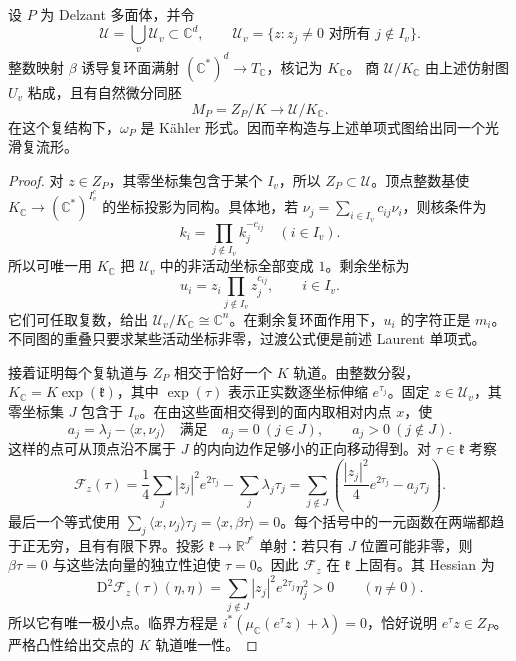 \begin{proposition}\label{g4:prop:1205:complex-quotient}
	设 \(P\) 为 Delzant 多面体，并令
	\[
		\mathcal U=\bigcup_v\mathcal U_v\subset\mathbb C^d,\qquad
		\mathcal U_v=\{z:z_j\ne0\text{ 对所有 }j\notin I_v\}.
	\]
	整数映射 \(\beta\) 诱导复环面满射
	\((\mathbb C^*)^d\to T_{\mathbb C}\)，核记为 \(K_{\mathbb C}\)。
	商 \(\mathcal U/K_{\mathbb C}\) 由上述仿射图 \(U_v\) 粘成，且有自然微分同胚
	\[
		M_P=Z_P/K\longrightarrow\mathcal U/K_{\mathbb C}.
	\]
	在这个复结构下，\(\omega_P\) 是 Kähler 形式。因而辛构造与上述单项式图给出同一个光滑复流形。
\end{proposition}
\begin{proof}
	对 \(z\in Z_P\)，其零坐标集包含于某个 \(I_v\)，所以 \(Z_P\subset\mathcal U\)。顶点整数基使 \(K_{\mathbb C}\to(\mathbb C^*)^{I_v^c}\) 的坐标投影为同构。具体地，若
	\(\nu_j=\sum_{i\in I_v}c_{ij}\nu_i\)，则核条件为
	\[
		k_i=\prod_{j\notin I_v}k_j^{-c_{ij}}\quad(i\in I_v).
	\]
	所以可唯一用 \(K_{\mathbb C}\) 把 \(\mathcal U_v\) 中的非活动坐标全部变成 \(1\)。剩余坐标为
	\[
		u_i=z_i\prod_{j\notin I_v}z_j^{c_{ij}},\qquad i\in I_v.
	\]
	它们可任取复数，给出 \(\mathcal U_v/K_{\mathbb C}\cong\mathbb C^n\)。在剩余复环面作用下，\(u_i\) 的字符正是 \(m_i\)。不同图的重叠只要求某些活动坐标非零，过渡公式便是前述 Laurent 单项式。

	接着证明每个复轨道与 \(Z_P\) 相交于恰好一个 \(K\) 轨道。由整数分裂，
	\(K_{\mathbb C}=K\exp(\mathfrak k)\)，其中 \(\exp(\tau)\) 表示正实数逐坐标伸缩 \(e^{\tau_j}\)。固定 \(z\in\mathcal U_v\)，其零坐标集 \(J\) 包含于 \(I_v\)。在由这些面相交得到的面内取相对内点 \(x\)，使
	\[
		a_j=\lambda_j-\langle x,\nu_j\rangle
		\quad\text{满足}\quad
		a_j=0\ (j\in J),\qquad a_j>0\ (j\notin J).
	\]
	这样的点可从顶点沿不属于 \(J\) 的内向边作足够小的正向移动得到。对 \(\tau\in\mathfrak k\) 考察
	\[
		\mathcal F_z(\tau)
		=\frac14\sum_j|z_j|^2e^{2\tau_j}
			-\sum_j\lambda_j\tau_j
		=\sum_{j\notin J}
		\left(\frac{|z_j|^2}{4}e^{2\tau_j}-a_j\tau_j\right).
	\]
	最后一个等式使用 \(\sum_j\langle x,\nu_j\rangle\tau_j
	=\langle x,\beta\tau\rangle=0\)。每个括号中的一元函数在两端都趋于正无穷，且有有限下界。投影
	\(\mathfrak k\to\mathbb R^{J^c}\) 单射：若只有 \(J\) 位置可能非零，则 \(\beta\tau=0\) 与这些法向量的独立性迫使 \(\tau=0\)。因此 \(\mathcal F_z\) 在 \(\mathfrak k\) 上固有。其 Hessian 为
	\[
		\mathrm{D}^2\mathcal F_z(\tau)(\eta,\eta)
		=\sum_{j\notin J}|z_j|^2e^{2\tau_j}\eta_j^2>0
		\qquad(\eta\ne0).
	\]
	所以它有唯一极小点。临界方程是
	\(i^*(\mu_{\mathbb C}(e^\tau z)+\lambda)=0\)，恰好说明 \(e^\tau z\in Z_P\)。严格凸性给出交点的 \(K\) 轨道唯一性。


\end{proof}
